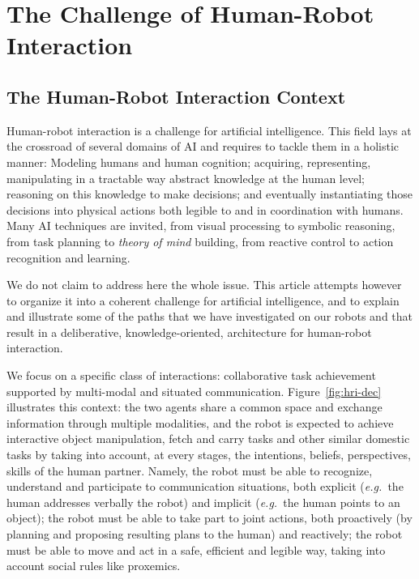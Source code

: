 \documentclass[preprint,3p,times]{elsarticle}
\newcommand{\eg}{{\textit{e.g.\ }}}
\begin{document}

\section{The Challenge of Human-Robot Interaction}

\subsection{The Human-Robot Interaction Context}

Human-robot interaction is a challenge for artificial intelligence. This field
lays at the crossroad of several domains of AI and requires to tackle them in a
holistic manner: Modeling humans and human cognition; acquiring, representing,
manipulating in a tractable way abstract knowledge at the human level; reasoning
on this knowledge to make decisions; and eventually instantiating those
decisions into physical actions both legible to and in coordination with humans.
Many AI techniques are invited, from visual processing to symbolic reasoning,
from task planning to \emph{theory of mind} building, from reactive control to
action recognition and learning.

We do not claim to address here the whole issue. This article attempts however to organize
it into a coherent challenge for artificial intelligence, and to explain and
illustrate some of the paths that we have investigated on our robots and that
result in a deliberative, knowledge-oriented, architecture for human-robot
interaction.

We focus on a specific class of interactions: collaborative task achievement
supported by multi-modal and situated communication. Figure~\ref{fig:hri-dec}
illustrates this context: the two agents share a common space and exchange
information through multiple modalities, and the robot is expected to achieve
interactive object manipulation, fetch and carry tasks and other similar
domestic tasks by taking into account, at every stages, the intentions, beliefs,
perspectives, skills of the human partner.  Namely, the robot must be able to
recognize, understand and participate to communication situations, both explicit
(\eg the human addresses verbally the robot) and implicit (\eg the human points
to an object); the robot must be able to take part to joint actions, both
proactively (by planning and proposing resulting plans to the human) and
reactively; the robot must be able to move and act in a safe, efficient and
legible way, taking into account social rules like proxemics.
\end{document}
